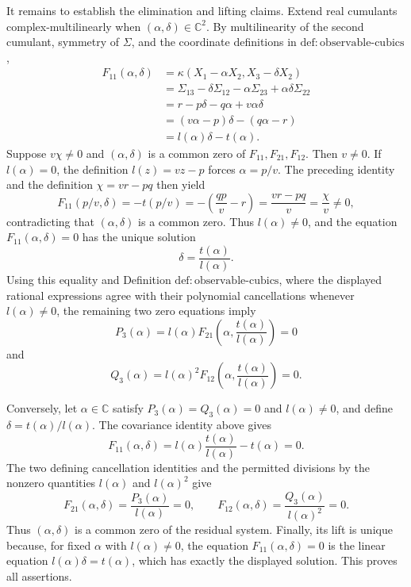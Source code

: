 It remains to establish the elimination and lifting claims.  Extend real cumulants complex-multilinearly when \((\alpha,\delta)\in\mathbb C^2\).  By multilinearity of the second cumulant, symmetry of \(\Sigma\), and the coordinate definitions in \(\mathrm{def:observable\mbox{-}cubics}\),
\[
\begin{aligned}
F_{11}(\alpha,\delta)
&=\kappa(X_1-\alpha X_2,X_3-\delta X_2)\\
&=\Sigma_{13}-\delta\Sigma_{12}-\alpha\Sigma_{23}
  +\alpha\delta\Sigma_{22}\\
&=r-p\delta-q\alpha+v\alpha\delta\\
&=(v\alpha-p)\delta-(q\alpha-r)\\
&=l(\alpha)\delta-t(\alpha).
\end{aligned}
\]
Suppose \(v\chi\neq0\) and \((\alpha,\delta)\) is a common zero of \(F_{11},F_{21},F_{12}\).  Then \(v\neq0\).  If \(l(\alpha)=0\), the definition \(l(z)=vz-p\) forces \(\alpha=p/v\).  The preceding identity and the definition \(\chi=vr-pq\) then yield
\[
F_{11}(p/v,\delta)
=-t(p/v)
=-\left(\frac{qp}{v}-r\right)
=\frac{vr-pq}{v}
=\frac{\chi}{v}\neq0,
\]
contradicting that \((\alpha,\delta)\) is a common zero.  Thus \(l(\alpha)\neq0\), and the equation \(F_{11}(\alpha,\delta)=0\) has the unique solution
\[
\delta=\frac{t(\alpha)}{l(\alpha)}.
\]
Using this equality and Definition \(\mathrm{def:observable\mbox{-}cubics}\), where the displayed rational expressions agree with their polynomial cancellations whenever \(l(\alpha)\neq0\), the remaining two zero equations imply
\[
P_3(\alpha)
=l(\alpha)F_{21}\!\left(\alpha,\frac{t(\alpha)}{l(\alpha)}\right)
=0
\]
and
\[
Q_3(\alpha)
=l(\alpha)^2F_{12}\!\left(\alpha,\frac{t(\alpha)}{l(\alpha)}\right)
=0.
\]

Conversely, let \(\alpha\in\mathbb C\) satisfy \(P_3(\alpha)=Q_3(\alpha)=0\) and \(l(\alpha)\neq0\), and define \(\delta=t(\alpha)/l(\alpha)\).  The covariance identity above gives
\[
F_{11}(\alpha,\delta)
=l(\alpha)\frac{t(\alpha)}{l(\alpha)}-t(\alpha)=0.
\]
The two defining cancellation identities and the permitted divisions by the nonzero quantities \(l(\alpha)\) and \(l(\alpha)^2\) give
\[
F_{21}(\alpha,\delta)
=\frac{P_3(\alpha)}{l(\alpha)}=0,
\qquad
F_{12}(\alpha,\delta)
=\frac{Q_3(\alpha)}{l(\alpha)^2}=0.
\]
Thus \((\alpha,\delta)\) is a common zero of the residual system.  Finally, its lift is unique because, for fixed \(\alpha\) with \(l(\alpha)\neq0\), the equation \(F_{11}(\alpha,\delta)=0\) is the linear equation \(l(\alpha)\delta=t(\alpha)\), which has exactly the displayed solution.  This proves all assertions.
